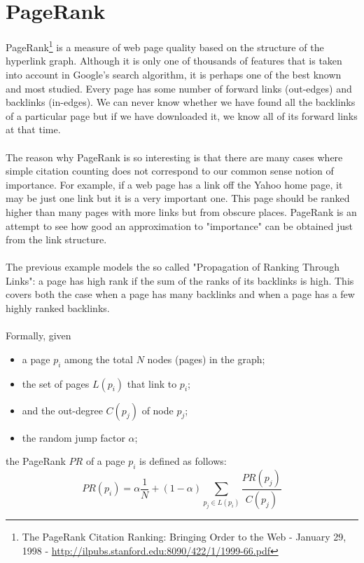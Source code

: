 \documentclass[11pt,a4paper]{article}
\begin{document}
\section{PageRank}
PageRank\footnote{The PageRank Citation Ranking: Bringing Order to the Web - January 29, 1998 - \url{http://ilpubs.stanford.edu:8090/422/1/1999-66.pdf}} is a measure of web page quality based on the structure of the hyperlink graph. Although it is only one of thousands of features that is taken into account in Google's search algorithm, it is perhaps one of the best known and most studied. Every page has some number of forward links (out-edges) and backlinks (in-edges). We can never know whether we have found all the backlinks of a particular page but if we have downloaded it, we know all of its forward links at that time.\\
\\
The reason why PageRank is so interesting is that there are many cases where simple citation counting does not correspond to our common sense notion of importance. For example, if a web page has a link off the Yahoo home page, it may be just one link but it is a very important one. This page should be ranked higher than many pages with more links but from obscure places. PageRank is an attempt to see how good an approximation to "importance" can be obtained just from the link structure.\\
\\
The previous example models the so called "Propagation of Ranking Through Links": a page has high rank if the sum of the ranks of its backlinks is high. This covers both the case when a page has many backlinks and when a page has a few highly ranked backlinks.\\
\\
Formally, given
\begin{itemize}
    \item a page $p_i$ among the total $N$ nodes (pages) in the graph;
    \item the set of pages $L(p_i)$ that link to $p_i$;
    \item and the out-degree $C(p_j)$ of node $p_j$;
    \item the random jump factor $\alpha$;
\end{itemize}
the PageRank $PR$ of a page $p_i$ is defined as follows:
$$PR(p_i) = \alpha \frac{1}{N} + (1 - \alpha) \sum_{p_j \in L(p_i)}\frac{PR(p_j)}{C(p_j)}$$
\end{document}
